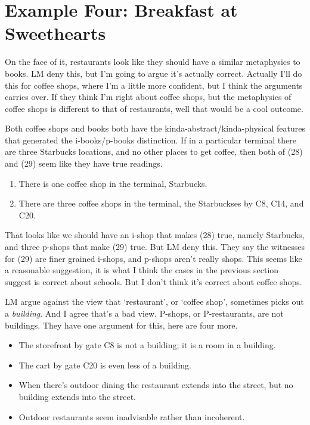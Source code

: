 \documentclass[
  11pt,
  letterpaper,
  DIV=11,
  numbers=noendperiod,
  twoside]{scrartcl}
\providecommand{\tightlist}{%
  \setlength{\itemsep}{0pt}\setlength{\parskip}{0pt}}
\begin{document}
\section{Example Four: Breakfast at
Sweethearts}\label{example-four-breakfast-at-sweethearts}

On the face of it, restaurants look like they should have a similar
metaphysics to books. LM deny this, but I'm going to argue it's actually
correct. Actually I'll do this for coffee shops, where I'm a little more
confident, but I think the arguments carries over. If they think I'm
right about coffee shops, but the metaphysics of coffee shops is
different to that of restaurants, well that would be a cool outcome.

Both coffee shops and books both have the kinda-abstract/kinda-physical
features that generated the i-books/p-books distinction. If in a
particular terminal there are three Starbucks locations, and no other
places to get coffee, then both of (28) and (29) seem like they have
true readings.

\begin{enumerate}
\def\labelenumi{(\arabic{enumi})}
\setcounter{enumi}{27}
\tightlist
\item
  There is one coffee shop in the terminal, Starbucks.
\item
  There are three coffee shops in the terminal, the Starbuckses by C8,
  C14, and C20.
\end{enumerate}

That looks like we should have an i-shop that makes (28) true, namely
Starbucks, and three p-shops that make (29) true. But LM deny this. They
say the witnesses for (29) are finer grained i-shops, and p-shops aren't
really shops. This seems like a reasonable suggestion, it is what I
think the cases in the previous section suggest is correct about
schools. But I don't think it's correct about coffee shops.

LM argue against the view that `restaurant', or `coffee shop', sometimes
picks out a \emph{building}. And I agree that's a bad view. P-shops, or
P-restaurants, are not buildings. They have one argument for this, here
are four more.

\begin{itemize}
\tightlist
\item
  The storefront by gate C8 is not a building; it is a room in a
  building.
\item
  The cart by gate C20 is even less of a building.
\item
  When there's outdoor dining the restaurant extends into the street,
  but no building extends into the street.
\item
  Outdoor restaurants seem inadvisable rather than incoherent.
\end{itemize}
\end{document}
